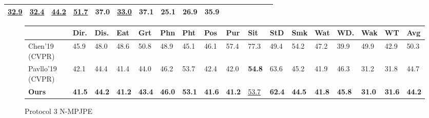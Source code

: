 \documentclass[runningheads]{llncs}
\begin{document}
\begin{table}
\begin{center}
\begin{tabular}{|l|l|l|l|l|l|l|l|l|l|l|l|l|l|l|l|l| }
\underline{32.9} &

\underline{32.4} &

\underline{44.2} &

\underline{51.7} &

\textbf{37.0} &

\underline{33.0} &

37.1 &

\textbf{25.1} &

\textbf{26.9} &

\textbf{35.9}
\\ \hline

\end{tabular}

\end{center}
\label{table:p-mpjpe}
\end{table}



\begin{figure*}
\begin{center}


\tiny
\begin{tabular}{|l|l|l|l|l|l|l|l|l|l|l|l|l|l|l|l|l| }\hline
 & Dir.& Dis.& Eat & Grt & Phn & Pht& Pos& Pur & Sit& StD & Smk & Wat & WD. & Wak & WT & Avg \\ \hline

Chen'19 (CVPR) & 45.9 & 48.0 & 48.6 & 50.8 & 48.9 & 45.1 & 46.1 & 57.4 & 77.3 & 49.4 &  54.2 & 47.2 & 39.9 & 49.9 & 42.9 & 50.3 \\ \hline



Pavllo'19 (CVPR) &
42.1 &
44.4 &
41.4 &
44.0 &
46.2 &
53.7 &
42.4 &
42.0 &
\textbf{54.8} &
63.6 &
45.2 &
41.9 &
46.3 &
31.2 &
31.8 &
44.7
\\ \hline



\textbf{Ours} &

\textbf{41.5} &

\textbf{44.2} &

\textbf{41.2} &

\textbf{43.4} &

\textbf{46.0} &

\textbf{53.1} &

\textbf{41.6} &

\textbf{41.2} &

\underline{53.7} &

\textbf{62.4} &

\textbf{44.5} &

\textbf{41.8} &

\textbf{45.8} &

\textbf{31.0} &

\textbf{31.6} &

\textbf{44.2}

\\ \hline

\end{tabular}

\end{center}
\label{table:n-mpjpe}
\caption{Protocol 3 N-MPJPE}
\end{figure*}
\end{document}
